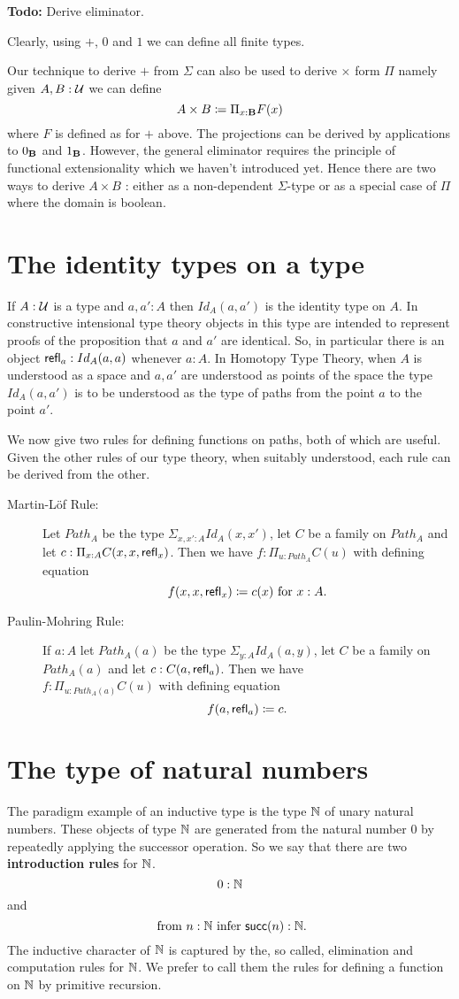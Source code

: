 \textbf{Todo:} Derive eliminator.

Clearly, using $+$, $0$ and $1$ we can define all finite types.

Our technique to derive $+$ from $\Sigma$ can also be used to derive
$\times$ form $\Pi$ namely given $A,B:{\mathcal U}$ we can define 
\[ A \times B \coloneqq \Pi_{x:{\bf B}}F(x)\]
where $F$ is defined as for $+$ above. The projections can be derived
by applications to $0_{\bf B}$ and $1_{\bf B}$. However, the general
eliminator requires the principle of functional extensionality which
we haven't introduced yet. Hence there are two ways to derive $A\times
B$ : either as a non-dependent $\Sigma$-type or as a special case of
$\Pi$ where the domain is boolean. 

\section{The identity types on a type}
If $A:{\mathcal U}$ is a type and $a,a':A$ then $Id_A(a,a')$ is the identity type on $A$.  
In constructive intensional type theory objects in this type are intended to represent proofs of the proposition that $a$ and $a'$ are identical.  So, in particular there is an object $\mathsf{refl}_{a}:Id_A(a,a)$ whenever $a:A$.  In Homotopy Type Theory, when $A$ is understood as a space and $a,a'$ are understood as points of the space the type $Id_A(a,a')$ is to be understood as the type of paths from the point $a$ to the point $a'$.

We now give two rules for defining functions on paths, both of which are useful.  Given the other rules of our type theory, when suitably understood, each rule can be derived from the other. 

\begin{description}
\item[Martin-L\"{o}f Rule:] Let $Path_A$ be the type $\Sigma_{x,x':A}Id_A(x,x')$, let $C$ be a family on $Path_A$ and let $c:\Pi_{x:A}C(x,x,\mathsf{refl}_{x})$.  Then we have $f:\Pi_{u:Path_A}C(u)$ with defining equation
  \[ f(x,x,\mathsf{refl}_{x})\coloneqq c(x)\mbox{ for } x:A.\]
\item[Paulin-Mohring Rule:] If $a:A$ let $Path_A(a)$ be the type $\Sigma_{y:A}Id_A(a,y)$, let $C$ be a family on $Path_A(a)$ and let $c:C(a,\mathsf{refl}_{a})$. Then we have\\ $f:\Pi_{u:Path_A(a)}C(u)$ with defining equation
    \[ f(a,\mathsf{refl}_{a})\coloneqq c.\]
\end{description}

\section{The type of natural numbers}
The paradigm example of an inductive type is the type $\mathbb{N}$ of unary natural numbers.  These objects of type $\mathbb{N}$ are generated from the natural number $0$ by repeatedly applying the successor operation.  So we say that there are two {\bf introduction rules} for $\mathbb{N}$. 
  \[ 0:\mathbb{N}\]
and
  \[ \mbox{ from $n:\mathbb{N}$ infer $\mathsf{succ}(n):\mathbb{N}$}.\]
The inductive character of $\mathbb{N}$ is captured by the, so called, elimination and computation rules for $\mathbb{N}$.  We prefer to call them the rules for defining a function on $\mathbb{N}$ by primitive recursion. 

